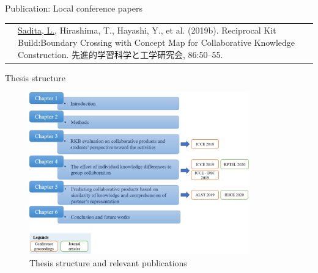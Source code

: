 \begin{frame}{Publication: Local conference papers}
\begin{tabular}{p{15mm}p{80mm}}
    \tiny{\color{blue}{ALST 2019}} &\underline{Sadita, L.}, Hirashima, T., Hayashi, Y., et al. (2019b). Reciprocal Kit Build:Boundary Crossing with Concept Map for Collaborative Knowledge Construction. 先進的学習科学と工学研究会, 86:50–55.
\end{tabular}
\end{frame}

\begin{frame}{Thesis structure}
    \begin{figure}[tb]
        \begin{center}
            \includegraphics[width=95mm]{images/thesis_structures.pdf} 
        \end{center}
        \caption{Thesis structure and relevant publications}
        \label{thesis_struct}
    \end{figure}
\end{frame}